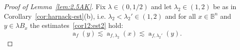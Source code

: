\documentclass[11pt,a4paper,reqno]{amsart}
\theoremstyle{definition}
\renewcommand{\a}{\operatorname{a}}
\newcommand{\B}{\mathbb{B}^n}
\newcommand{\red}{\color{red}}
\newcounter{komcounter}
\numberwithin{komcounter}{section}
\newcommand{\komI}[1]{{\bf \red [\refstepcounter{komcounter}\thekomcounter (by I): #1]}}
\begin{document}
\begin{proof}[Proof of Lemma~\ref{lem:2.5AK}]
%
%	

Fix $\lambda\in (0,1/2)$ and let $\lambda_2\in (1,2)$ be as in Corollary~\ref{cor:harnack-est}(b), i.e. $\lambda_2 <\lambda_2' \in (1,2)$ and  for all $x\in \B$ and $y\in \lambda B_x$ the estimates~\eqref{cor12:est2} hold: 
\begin{equation}\label{eq:Harnack2lem3.4} 
	 \a_f(y)\lesssim \a_{f,\lambda_2}(x) \lesssim \a_{f,\lambda_2'}(y).
\end{equation}


\end{proof}
\end{document}
